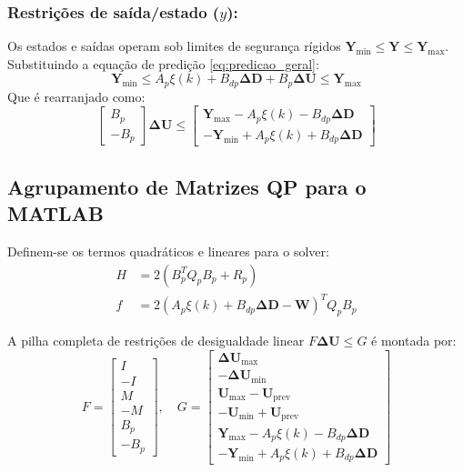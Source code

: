 \documentclass[12pt,journal,onecolumn]{article}
\begin{document}
\subsubsection{Restrições de saída/estado ($y$):}
Os estados e saídas operam sob limites de segurança rígidos $\bm{Y}_{\text{min}} \le \bm{Y} \le \bm{Y}_{\text{max}}$. Substituindo a equação de predição \eqref{eq:predicao_geral}:
\begin{equation}
\bm{Y}_{\text{min}} \le A_p \xi(k) + B_{dp} \bm{\Delta D} + B_p \bm{\Delta U} \le \bm{Y}_{\text{max}}
\end{equation}
Que é rearranjado como:
\begin{equation}
\begin{bmatrix} B_p \\ -B_p \end{bmatrix} \bm{\Delta U} \le \begin{bmatrix} \bm{Y}_{\text{max}} - A_p \xi(k) - B_{dp} \bm{\Delta D} \\ -\bm{Y}_{\text{min}} + A_p \xi(k) + B_{dp} \bm{\Delta D} \end{bmatrix}
\end{equation}

\subsection{Agrupamento de Matrizes QP para o MATLAB}
Definem-se os termos quadráticos e lineares para o solver:
\begin{align}
H &= 2(B_p^T Q_p B_p + R_p) \\
f &= 2(A_p \xi(k) + B_{dp} \bm{\Delta D} - \bm{W})^T Q_p B_p
\end{align}

A pilha completa de restrições de desigualdade linear $F \bm{\Delta U} \le G$ é montada por:
\begin{equation}
F = \begin{bmatrix} I \\ -I \\ M \\ -M \\ B_p \\ -B_p \end{bmatrix}, \quad
G = \begin{bmatrix} 
\bm{\Delta U}_{\text{max}} \\ 
-\bm{\Delta U}_{\text{min}} \\ 
\bm{U}_{\text{max}} - \bm{U}_{\text{prev}} \\ 
-\bm{U}_{\text{min}} + \bm{U}_{\text{prev}} \\ 
\bm{Y}_{\text{max}} - A_p \xi(k) - B_{dp} \bm{\Delta D} \\ 
-\bm{Y}_{\text{min}} + A_p \xi(k) + B_{dp} \bm{\Delta D} 
\end{bmatrix}
\end{equation}
\end{document}
